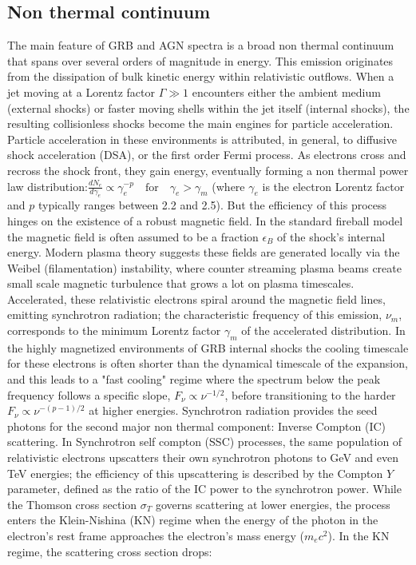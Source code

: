 \documentclass{aa} %
\begin{document}
\subsection{Non thermal continuum}
The main feature of GRB and AGN spectra is a broad non thermal continuum that spans over several orders of magnitude in energy. This emission originates from the dissipation of bulk kinetic energy within relativistic outflows. When a jet moving at a Lorentz factor $\Gamma \gg 1$ encounters either the ambient medium (external shocks) or faster moving shells within the jet itself (internal shocks), the resulting collisionless shocks become the main engines for particle acceleration. Particle acceleration in these environments is attributed, in general, to diffusive shock acceleration (DSA), or the first order Fermi process. As electrons cross and recross the shock front, they gain energy, eventually forming a non thermal power law distribution:$\frac{dN_e}{d\gamma_e} \propto \gamma_e^{-p} \quad \text{for} \quad \gamma_e > \gamma_m$ (where $\gamma_e$ is the electron Lorentz factor and $p$ typically ranges between 2.2 and 2.5). But the efficiency of this process hinges on the existence of a robust magnetic field. In the standard fireball model the magnetic field is often assumed to be a fraction $\epsilon_B$ of the shock’s internal energy. Modern plasma theory suggests these fields are generated locally via the Weibel (filamentation) instability, where counter streaming plasma beams create small scale magnetic turbulence that grows a lot on plasma timescales. Accelerated, these relativistic electrons spiral around the magnetic field lines, emitting synchrotron radiation; the characteristic frequency of this emission, $\nu_m$, corresponds to the minimum Lorentz factor $\gamma_m$ of the accelerated distribution. In the highly magnetized environments of GRB internal shocks the cooling timescale for these electrons is often shorter than the dynamical timescale of the expansion, and this leads to a "fast cooling" regime where the spectrum below the peak frequency follows a specific slope, $F_\nu \propto \nu^{-1/2}$, before transitioning to the harder $F_\nu \propto \nu^{-(p-1)/2}$ at higher energies. Synchrotron radiation provides the seed photons for the second major non thermal component: Inverse Compton (IC) scattering. In Synchrotron self compton (SSC) processes, the same population of relativistic electrons upscatters their own synchrotron photons to GeV and even TeV energies; the efficiency of this upscattering is described by the Compton $Y$ parameter, defined as the ratio of the IC power to the synchrotron power. While the Thomson cross section $\sigma_T$ governs scattering at lower energies, the process enters the Klein-Nishina (KN) regime when the energy of the photon in the electron's rest frame approaches the electron's mass energy ($m_e c^2$). In the KN regime, the scattering cross section drops:
\end{document}
